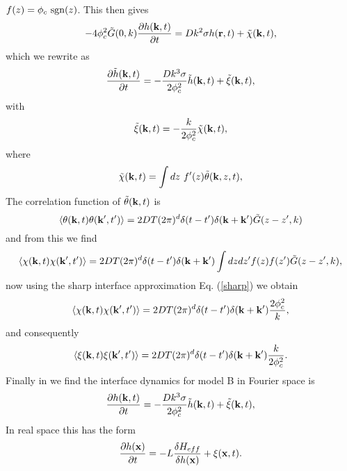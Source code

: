 \documentclass[11pt]{report}
\begin{document}
$f(z) = \phi_c\  {\rm sgn}(z)$. This then gives
\begin{equation}
-4\phi_c^2 \tilde G(0,k) \frac{\partial h({\bf k},t)}{\partial t} = 
Dk^2\sigma  h({\bf r},t) + \tilde \chi({\bf k},t),
\end{equation}
which we rewrite as
\begin{equation}
\frac{\partial \tilde h({\bf k},t)}{\partial t} = -\frac{Dk^3\sigma}{2\phi_c^2} \tilde h({\bf k},t) + \tilde \xi({\bf k},t),
\end{equation}
with 
\begin{equation}
\tilde \xi({\bf k},t)= - \frac{k}{2\phi_c^2}\tilde \chi({\bf k},t),
\end{equation}
where 
\begin{equation}
\tilde \chi({\bf k},t)= \int dz\  f'(z) \tilde\theta({\bf k},z,t),
\end{equation}
The correlation function of $\tilde \theta({\bf k},t)$ is 
\begin{equation}
\langle \theta({\bf k},t)\theta({\bf k}',t')\rangle = 2DT(2\pi)^d \delta(t-t') \delta({\bf k}+{\bf k'}) \tilde G(z-z',k)
\end{equation}
and from this we find 
\begin{equation}
\langle \chi({\bf k},t)\chi({\bf k}',t')\rangle  = 2DT(2\pi)^d \delta(t-t') \delta({\bf k}+{\bf k'}) \int dz dz'
f(z) f(z') \tilde G(z-z',k),\label{bstep2}
\end{equation}
now using the sharp interface approximation Eq. (\ref{sharp}) we obtain
\begin{equation}
\langle \chi({\bf k},t)\chi({\bf k}',t')\rangle  = 2DT(2\pi)^d \delta(t-t') \delta({\bf k}+{\bf k'}) \frac{2\phi_c^2}{k},
\end{equation}
and consequently
\begin{equation}
\langle \xi({\bf k},t)\xi({\bf k}',t')\rangle = 2DT(2\pi)^d \delta(t-t') \delta({\bf k}+{\bf k'}) \frac{k}{2\phi_c^2}.
\end{equation}
Finally in we find the interface dynamics for model B in Fourier space is
\begin{equation}
\frac{\partial h({\bf k},t)}{\partial t} = -\frac{Dk^3\sigma}{2\phi_c^2} \tilde h({\bf k},t) + \tilde \xi({\bf k},t),\label{modBFT}
\end{equation}
In real space this has the form
\begin{equation}
\frac{\partial h({\bf x})}{\partial t}= -L \frac{\delta H_{eff}}{\delta h ({\bf x})} + \xi({\bf x},t).
\end{equation}
\end{document}
